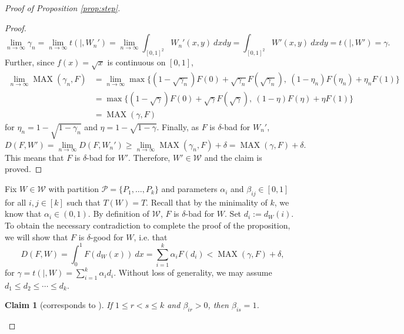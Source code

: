 \documentclass[11pt]{article}
\newtheorem{claim}[thm]{Claim}
\theoremstyle{definition}
\begin{document}
\begin{proof}[Proof of Proposition \ref{prop:step}]
\begin{proof}
        \[ \lim_{n \to \infty} \gamma_n = \lim_{n \to \infty} t (|, W_n') = \lim_{n \to \infty} \int_{[0,1]^2} W_n' (x,y) ~dx dy = \int_{[0,1]^2} W' (x,y) ~dx dy = t (|, W') = \gamma.\]
        Further, since $f(x) = \sqrt{x}$ is continuous on $[0,1]$, \begin{align*}
            \lim_{n \to \infty} \operatorname{MAX} (\gamma_n, F) &= \lim_{n \to \infty} \max \{ (1 - \sqrt{\gamma_n}) F (0) + \sqrt{\gamma_n} F (\sqrt{\gamma_n}),~ (1 - \eta_n) F (\eta_n) + \eta_n F(1) \} \\
            &= \max \{ (1 - \sqrt{\gamma}) F (0) + \sqrt{\gamma} F (\sqrt{\gamma}),~ (1 - \eta) F (\eta) + \eta F(1) \} \\
            &= \operatorname{MAX} (\gamma, F)
        \end{align*} for $\eta_n = 1 - \sqrt{1 - \gamma_n}$ and $\eta = 1 - \sqrt{1 - \gamma}$. Finally, as $F$ is $\delta$-bad for $W_n'$, 
        \[D (F, W') =\lim_{n \to \infty} D (F, W_n') \ge \lim_{n \to \infty} \operatorname{MAX} (\gamma_n, F) +\delta =\operatorname{MAX} (\gamma, F) + \delta.\] This means that $F$ is $\delta$-bad for $W'$. Therefore, $W' \in \mathcal W$ and the claim is proved. 
    \end{proof}

    Fix $W \in \mathcal{W}$ with partition $\mathcal{P} = \{P_1, \ldots, P_k\}$ and parameters $\alpha_i$  and $\beta_{ij}\in [0,1]$ for all $i,j\in [k]$ such that $T(W) = T$. Recall that by the minimality of $k$, we know that $\alpha_i \in (0,1)$. By definition of $\mathcal W$, $F$ is $\delta$-bad for $W$. Set $d_i := d_W (i)$.
    To obtain the necessary contradiction to complete the proof of the proposition,  we will show that $F$ is $\delta$-good for $W$, i.e. that 
    \[ D(F, W) = \int_0^1 F (d_W (x)) ~dx = \sum_{i = 1}^k \alpha_i F (d_i) < \operatorname{MAX} (\gamma, F) + \delta, \] 
    for $\gamma =  t (|, W)= \sum_{i = 1}^k \alpha_i d_i$. Without loss of generality, we may assume $d_1 \le d_2 \le \cdots \le d_k$.
    
    \begin{claim}[corresponds to {\cite[Claim 3.8]{RW}}] \label{claim:main}
    	If $1 \le r < s \le k$ and $\beta_{ir} > 0$, then $\beta_{is} = 1$.
    \end{claim}


\end{proof}
\end{document}
